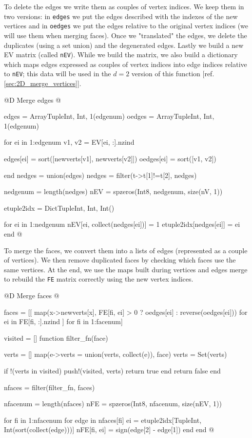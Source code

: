 To delete the edges we write them as couples of vertex
indices. We keep them in two versions: in \texttt{edges}
we put the edges described with the indexes of the new vertices
and in \texttt{oedges} we put the edges relative to the original vertex
indices (we will use them when merging faces). Once we "translated"
the edges, we delete the duplicates (using a set union) and the
degenerated edges. Lastly we build a new EV matrix 
(called \texttt{nEV}). While we
build the matrix, we also build a dictionary which maps edges expressed
as couples of vertex indices into edge indices relative to \texttt{nEV};
this data will be used in the $d=2$ version of this function 
[ref. \ref{sec:2D_merge_vertices}].

@D Merge edges
@{edges = Array{Tuple{Int, Int}, 1}(edgenum)
oedges = Array{Tuple{Int, Int}, 1}(edgenum)

for ei in 1:edgenum
    v1, v2 = EV[ei, :].nzind
    
    edges[ei] = sort([newverts[v1], newverts[v2]])
    oedges[ei] = sort([v1, v2])

end
nedges = union(edges)
nedges = filter(t->t[1]!=t[2], nedges)

nedgenum = length(nedges)
nEV = spzeros(Int8, nedgenum, size(nV, 1))

etuple2idx = Dict{Tuple{Int, Int}, Int}()

for ei in 1:nedgenum
    nEV[ei, collect(nedges[ei])] = 1
    etuple2idx[nedges[ei]] = ei
end
@}

To merge the faces, we convert them into a lists of
edges (represented as a couple of vertices). We then remove duplicated faces
by checking which faces use the same vertices. At the end, we use the
maps built during vertices and edges merge to rebuild the \texttt{FE}
matrix correctly using the new vertex indices.

@D Merge faces
@{faces = [[
    map(x->newverts[x], FE[fi, ei] > 0 ? oedges[ei] : reverse(oedges[ei]))
    for ei in FE[fi, :].nzind
] for fi in 1:facenum]


visited = []
function filter_fn(face)

    verts = []
    map(e->verts = union(verts, collect(e)), face)
    verts = Set(verts)

    if !(verts in visited)
        push!(visited, verts)
        return true
    end
    return false
end

nfaces = filter(filter_fn, faces)

nfacenum = length(nfaces)
nFE = spzeros(Int8, nfacenum, size(nEV, 1))

for fi in 1:nfacenum
    for edge in nfaces[fi]
        ei = etuple2idx[Tuple{Int, Int}(sort(collect(edge)))]
        nFE[fi, ei] = sign(edge[2] - edge[1])
    end
end
@}
